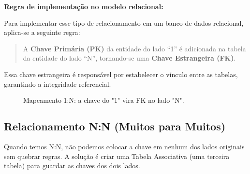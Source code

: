 \textbf{Regra de implementação no modelo relacional:}

Para implementar esse tipo de relacionamento em um banco de dados relacional, aplica-se a seguinte regra:

\begin{quote}
A \textbf{Chave Primária (PK)} da entidade do lado ``1'' é adicionada na tabela da entidade do lado ``N'', tornando-se uma \textbf{Chave Estrangeira (FK)}.
\end{quote}

Essa chave estrangeira é responsável por estabelecer o vínculo entre as tabelas, garantindo a integridade referencial.

\begin{figure}[H]
    \centering
    \caption{Mapeamento 1:N: a chave do "1" vira FK no lado "N".}
\end{figure}

\subsection{Relacionamento N:N (Muitos para Muitos)}

Quando temos N:N, não podemos colocar a chave em nenhum dos lados originais sem quebrar regras. A solução é criar uma Tabela Associativa  (uma terceira tabela) para guardar as chaves dos dois lados.

